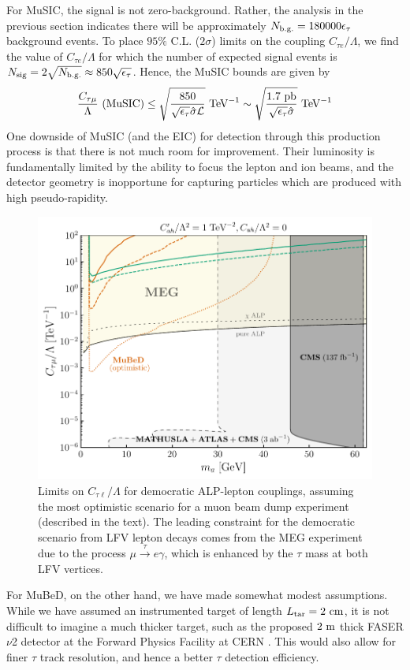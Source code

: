 For MuSIC, the signal is not zero-background. Rather, the analysis in the previous section indicates there will be approximately $N_{\rm b.g.} = 180000\epsilon_\tau$ background events. To place $95\%$ C.L. ($2\sigma$) limits on the coupling $C_{\tau e}/\Lambda$, we find the value of $C_{\tau e}/\Lambda$ for which the number of expected signal events is $N_{\rm sig} = 2\sqrt{N_{\rm b.g.}} \approx 850\sqrt{\epsilon_\tau}$. Hence, the MuSIC bounds are given by
\begin{align}
    \frac{C_{\tau\mu}}{\Lambda}~{({\rm MuSIC})}\leq \sqrt{\frac{850}{\sqrt{\epsilon_\tau}\hat{\sigma}{\cal L}}}~{\rm TeV}^{-1} \sim\sqrt{\frac{1.7~{\rm pb}}{\sqrt{\epsilon_\tau} \hat{\sigma}}}~{\rm TeV}^{-1}
\end{align}
One downside of MuSIC (and the EIC) for detection through this production process is that there is not much room for improvement. Their luminosity is fundamentally limited by the ability to focus the lepton and ion beams, and the detector geometry is inopportune for capturing particles which are produced with high pseudo-rapidity.
\begin{figure}[t!]
    \centering
    \includegraphics[width=0.6\linewidth]{figures/chapter5/MuBeD_optimistic.pdf}
    \caption[Optimistic projected constraints on LFV ALPs at MuBeD.]{Limits on $C_{\tau\ell}/\Lambda$ for democratic ALP-lepton couplings, assuming the most optimistic scenario for a muon beam dump experiment (described in the text). The leading constraint for the democratic scenario from LFV lepton decays comes from the MEG experiment due to the process $\mu\stackrel{\tau}{\longrightarrow}e\gamma$, which is enhanced by the $\tau$ mass at both LFV vertices.}
    \label{fig:MuBeD_optimistic}
\end{figure}
For MuBeD, on the other hand, we have made somewhat modest assumptions. While we have assumed an instrumented target of length $L_{\rm tar} = 2~{\rm cm}$, it is not difficult to imagine a much thicker target, such as the proposed $2~{\rm m}$ thick FASER$\nu$2 detector at the Forward Physics Facility at CERN \cite{FPFWorkingGroups:2025rsc}. This would also allow for finer $\tau$ track resolution, and hence a better $\tau$ detection efficiency.

